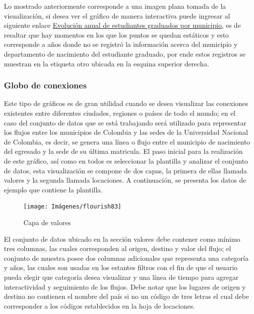 \documentclass[
]{book}
\begin{document}
Lo mostrado anteriormente corresponde a una imagen plana tomada de la visualización, si desea ver el gráfico de manera interactiva puede ingresar al siguiente enlace \href{https://preview.flourish.studio/5441266/qIJCGuNhtsQl3VM2HFDj3P_l9X2aisp0Zju101oZAHyTJDuirtp91-loXEcoCZGY/}{Evolución anual de estudiantes graduados por municipio}, es de resaltar que hay momentos en los que los puntos se quedan estáticos y esto corresponde a años donde no se registró la información acerca del municipio y departamento de nacimiento del estudiante graduado, por ende estos registros se muestran en la etiqueta otro ubicada en la esquina superior derecha.

\hypertarget{globodeconexionesflourish}{%
\subsubsection{Globo de conexiones}\label{globodeconexionesflourish}}

Este tipo de gráficos es de gran utilidad cuando se desea visualizar las conexiones existentes entre diferentes ciudades, regiones o países de todo el mundo; en el caso del conjunto de datos que se está trabajando será utilizado para representar los flujos entre los municipios de Colombia y las sedes de la Universidad Nacional de Colombia, es decir, se genera una línea o flujo entre el municipio de nacimiento del egresado y la sede de su última matricula.
El paso inicial para la realización de este gráfico, así como en todos es seleccionar la plantilla y analizar el conjunto de datos, esta visualización se compone de dos capas, la primera de ellas llamada valores y la segunda llamada locaciones. A continuación, se presenta los datos de ejemplo que contiene la plantilla.

\begin{figure}

{\centering \texttt{[image: Imágenes/flourish83]} 

}

\caption{Capa de valores}\label{fig:capavaloresgloboconexionesflourish-fig}
\end{figure}

El conjunto de datos ubicado en la sección valores debe contener como mínimo tres columnas, las cuales corresponden al origen, destino y valor del flujo; el conjunto de muestra posee dos columnas adicionales que representa una categoría y años, las cuales son usadas en los estantes filtros con el fin de que el usuario pueda elegir que categoría desea visualizar y una línea de tiempo para agregar interactividad y seguimiento de los flujos. Debe notar que los lugares de origen y destino no contienen el nombre del país si no un código de tres letras el cual debe corresponder a los códigos establecidos en la hoja de locaciones.
\end{document}
